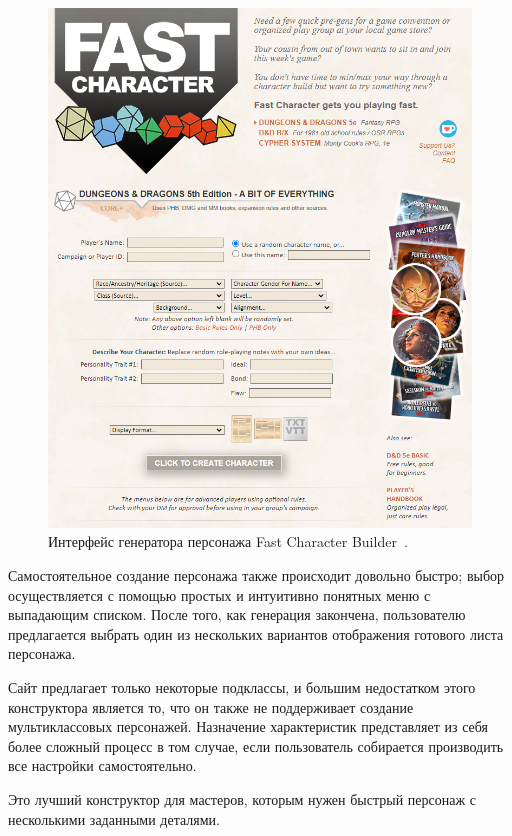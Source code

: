 \begin{figure}
    \centering
    \includegraphics[scale=0.4]{Fast_character.png}
    \caption{Интерфейс генератора персонажа Fast Character Builder~\cite{fast_char}.}
    \label{fig:fast_char}
\end{figure}

Самостоятельное создание персонажа также происходит довольно быстро; выбор осуществляется с помощью простых и интуитивно понятных меню с выпадающим списком. После того, как генерация закончена, пользователю предлагается выбрать один из нескольких вариантов отображения готового листа персонажа. 

Сайт предлагает только некоторые подклассы, и большим недостатком этого конструктора является то, что он также не поддерживает создание мультиклассовых персонажей. Назначение характеристик представляет из себя более сложный процесс в том случае, если пользователь собирается производить все настройки самостоятельно.

Это лучший конструктор для мастеров, которым нужен быстрый персонаж с несколькими заданными деталями. 

